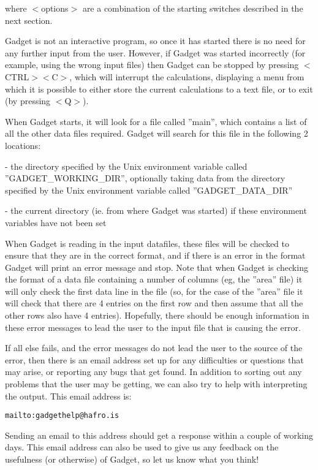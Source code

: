 \documentclass [a4paper, 10pt]{book}
\begin{document}
where $<$options$>$ are a combination of the starting switches described in the next section.

\bigskip
Gadget is not an interactive program, so once it has started there is no need for any further input from the user.  However, if Gadget was started incorrectly (for example, using the wrong input files) then Gadget can be stopped by pressing $<$CTRL$>$$<$C$>$, which will interrupt the calculations, displaying a menu from which it is possible to either store the current calculations to a text file, or to exit (by pressing $<$Q$>$).

\bigskip
When Gadget starts, it will look for a file called ''main'', which contains a list of all the other data files required.  Gadget will search for this file in the following 2 locations:

 - the directory specified by the Unix environment variable called ''GADGET\_WORKING\_DIR'', optionally taking data from the directory specified by the Unix environment variable called ''GADGET\_DATA\_DIR''

 - the current directory (ie. from where Gadget was started) if these environment variables have not been set

\bigskip
When Gadget is reading in the input datafiles, these files will be checked to ensure that they are in the correct format, and if there is an error in the format Gadget will print an error message and stop.  Note that when Gadget is checking the format of a data file containing a number of columns (eg, the ''area'' file) it will only check the first data line in the file (so, for the case of the ''area'' file it will check that there are 4 entries on the first row and then assume that all the other rows also have 4 entries).  Hopefully, there should be enough information in these error messages to lead the user to the input file that is causing the error.

\bigskip
If all else fails, and the error messages do not lead the user to the source of the error, then there is an email address set up for any difficulties or questions that may arise, or reporting any bugs that get found.  In addition to sorting out any problems that the user may be getting, we can also try to help with interpreting the output.  This email address is:

\begin{verbatim}
mailto:gadgethelp@hafro.is
\end{verbatim}

Sending an email to this address should get a response within a couple of working days.  This email address can also be used to give us any feedback on the usefulness (or otherwise) of Gadget, so let us know what you think!
\end{document}
